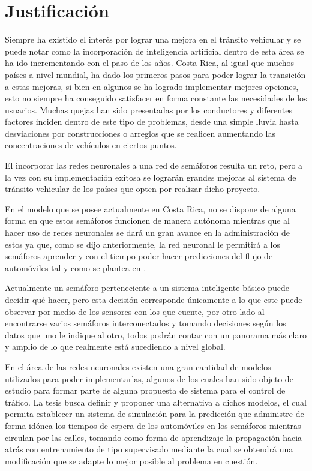 \section{Justificaci\'{o}n}

		
		Siempre ha existido el inter\'{e}s por lograr una mejora en el tr\'{a}nsito vehicular
	y se puede notar como la incorporaci\'{o}n de inteligencia artificial dentro de esta
	\'{a}rea  se ha ido incrementando con el paso de los a\~{n}os. Costa Rica, al
	igual que muchos pa\'{i}ses a nivel mundial, ha dado los primeros pasos para
	poder lograr la transici\'{o}n a estas mejoras, si bien en algunos se ha
	logrado implementar mejores opciones, esto no siempre ha conseguido satisfacer en forma constante las necesidades de los usuarios. Muchas quejas han sido
	presentadas por los conductores y diferentes factores inciden dentro de este
	tipo de problemas, desde una simple lluvia hasta desviaciones por construcciones o arreglos que se realicen aumentando las concentraciones de veh\'{i}culos en ciertos puntos.\cite{Fallas2007}
	
		El incorporar las redes neuronales a una red de sem\'{a}foros resulta un reto,
	pero a la vez con su implementaci\'{o}n exitosa se lograr\'{a}n grandes mejoras al sistema
	de tr\'{a}nsito vehicular de los pa\'{i}ses que opten por realizar dicho proyecto.
	
		En el modelo que se posee actualmente en Costa Rica, no se dispone de
		alguna forma en que estos sem\'{a}foros funcionen de manera aut\'{o}noma
		mientras que al hacer uso de redes neuronales se dar\'{a} un gran avance en la administraci\'{o}n de estos ya
	que, como se dijo anteriormente, la red neuronal le permitir\'{a} a los
	sem\'{a}foros aprender y con el tiempo poder hacer predicciones del flujo de
	autom\'{o}viles tal y como se plantea en \cite{Gilmore1993}.
	
		Actualmente un sem\'{a}foro perteneciente a un sistema inteligente b\'{a}sico puede
	decidir qu\'{e} hacer, pero esta decisi\'{o}n corresponde \'{u}nicamente a lo que este
	puede observar por medio de los sensores con los que cuente, por otro lado al
	encontrarse varios sem\'{a}foros interconectados y tomando decisiones seg\'{u}n los datos que uno le indique al otro, todos podr\'{a}n contar con un panorama m\'{a}s claro y amplio de lo que realmente est\'{a} sucediendo a nivel global.
	
		En el \'{a}rea de las redes neuronales existen una gran cantidad de modelos
	utilizados para poder implementarlas, algunos de los cuales han sido objeto de
	estudio para formar parte de alguna propuesta de sistema para el control de
	tr\'{a}fico. La tesis busca definir y  proponer una alternativa a dichos
	modelos, el cual permita establecer un sistema de simulaci\'{o}n para la
	predicci\'{o}n que administre de forma id\'{o}nea los tiempos de espera de los
	autom\'{o}viles en los sem\'{a}foros mientras circulan por las calles, tomando como forma de aprendizaje la propagaci\'{o}n hacia atr\'{a}s con entrenamiento de tipo supervisado mediante la cual se obtendr\'{a} una modificaci\'{o}n que se adapte lo mejor posible al problema en cuesti\'{o}n.
	

